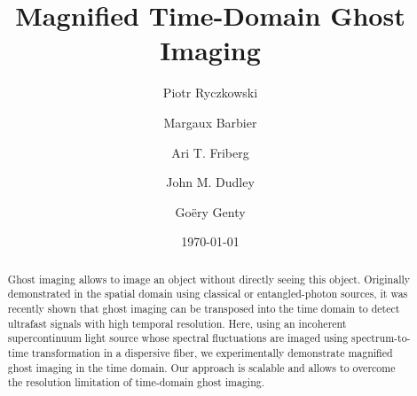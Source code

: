 \documentclass[aip,graphicx]{revtex4-1}
\begin{document}

\title{Magnified Time-Domain Ghost Imaging} %



\author{Piotr Ryczkowski}%

\author{Margaux Barbier}

\author{Ari T. Friberg}

\author{John M. Dudley}

\author{Go\"ery Genty}

\date{\today}

\begin{abstract}
Ghost imaging allows to image an object without directly seeing this object. Originally demonstrated in the spatial domain using classical or entangled-photon sources, it was recently shown that ghost imaging can be transposed into the time domain to detect ultrafast signals with high temporal resolution. Here, using an incoherent supercontinuum light source whose spectral fluctuations are imaged using spectrum-to-time transformation in a dispersive fiber, we experimentally demonstrate magnified ghost imaging in the time domain. Our approach is scalable and allows to overcome the resolution limitation of time-domain ghost imaging.
\end{abstract}
\end{document}
